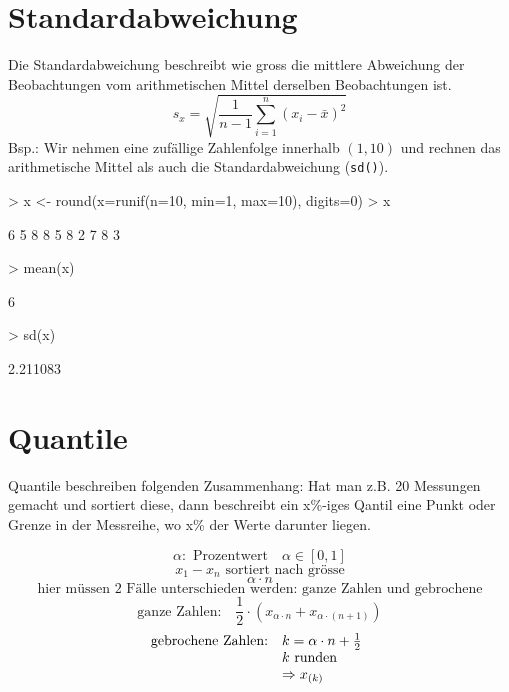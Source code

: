 \section{Standardabweichung}
Die Standardabweichung beschreibt wie gross die mittlere Abweichung der
Beobachtungen vom arithmetischen Mittel derselben Beobachtungen ist.
\[ s_x = \sqrt{ \frac{1}{n-1} \sum\limits_{i=1}^{n} (x_i - \bar{x})^2 } \]
Bsp.: Wir nehmen eine zufällige Zahlenfolge innerhalb $(1,10)$ und
rechnen das arithmetische Mittel als auch die Standardabweichung (\verb!sd()!).
\begin{Schunk}
\begin{Sinput}
> x <- round(x=runif(n=10, min=1, max=10), digits=0)
> x
\end{Sinput}
\begin{Soutput}
 [1] 6 5 8 8 5 8 2 7 8 3
\end{Soutput}
\begin{Sinput}
> mean(x)
\end{Sinput}
\begin{Soutput}
[1] 6
\end{Soutput}
\begin{Sinput}
> sd(x)
\end{Sinput}
\begin{Soutput}
[1] 2.211083
\end{Soutput}
\end{Schunk}

\section{Quantile}
Quantile beschreiben folgenden Zusammenhang: Hat man z.B. 20 Messungen gemacht
und sortiert diese, dann beschreibt ein x\%-iges Qantil eine Punkt oder Grenze
in der Messreihe, wo x\% der Werte darunter liegen.

\[ \alpha: \text{ Prozentwert} \quad \alpha \in [0,1] \]
\[ x_1 - x_n \text{ sortiert nach grösse}  \]
\[ \alpha \cdot n \]
\[ \text{hier müssen 2 Fälle unterschieden werden: ganze Zahlen und gebrochene} \]
\[ \text{ganze Zahlen:} \quad \frac{1}{2} 
\cdot (x_{\alpha \cdot n} + x_{\alpha \cdot (n+1)}) \]
\[ \begin{array}{@{}@{}ll}
	\text{gebrochene Zahlen:} & k=\alpha \cdot n + \frac{1}{2} \\
	                          & k \text{ runden} \\
				  & \Rightarrow x_{(k)}
\end{array}\]

